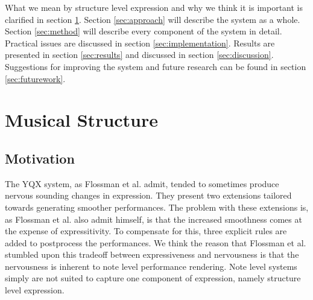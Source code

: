 \documentclass[a4paper,10pt]{article}
\begin{document}
What we mean by structure level expression and why we think it is important is clarified in section \ref{sec:structure}. Section \ref{sec:approach} will describe the system as a whole. Section \ref{sec:method} will describe every component of the system in detail. Practical issues are discussed in section \ref{sec:implementation}. Results are presented in section \ref{sec:results} and discussed in section \ref{sec:discussion}. Suggestions for improving the system and future research can be found in section \ref{sec:futurework}.




\section{Musical Structure}
\label{sec:structure}
\subsection{Motivation}

The YQX system, as Flossman et al. admit, tended to sometimes produce nervous sounding changes in expression. They present two extensions tailored towards generating smoother performances. The problem with these extensions is, as Flossman et al. also admit himself, is that the increased smoothness comes at the expense of expressitivity. To compensate for this, three explicit rules are added to postprocess the performances. We think the reason that Flossman et al. stumbled upon this tradeoff between expressiveness and nervousness is that the nervousness is inherent to note level performance rendering. Note level systems simply are not suited to capture one component of expression, namely structure level expression. 
\end{document}
